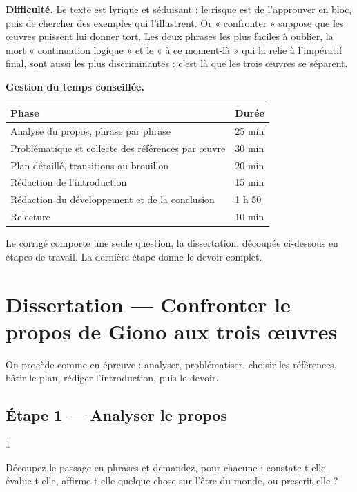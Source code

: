 \documentclass[11pt,a4paper]{article}
\begin{document}
\textbf{Difficulté.} Le texte est lyrique et séduisant : le risque est de l'approuver en bloc, puis de chercher des exemples qui l'illustrent. Or « confronter » suppose que les œuvres puissent lui donner tort. Les deux phrases les plus faciles à oublier, la mort « continuation logique » et le « à ce moment-là » qui la relie à l'impératif final, sont aussi les plus discriminantes : c'est là que les trois œuvres se séparent.

\textbf{Gestion du temps conseillée.}

\begin{longtable}[]{@{}ll@{}}
\toprule\noalign{}
Phase & Durée \\
\midrule\noalign{}
\endhead
\bottomrule\noalign{}
\endlastfoot
Analyse du propos, phrase par phrase & 25 min \\
Problématique et collecte des références par œuvre & 30 min \\
Plan détaillé, transitions au brouillon & 20 min \\
Rédaction de l'introduction & 15 min \\
Rédaction du développement et de la conclusion & 1 h 50 \\
Relecture & 10 min \\
\end{longtable}

Le corrigé comporte une seule question, la dissertation, découpée ci-dessous en étapes de travail. La dernière étape donne le devoir complet.

\hypertarget{dissertation-confronter-le-propos-de-giono-aux-trois-ux153uvres}{%
\section{Dissertation --- Confronter le propos de Giono aux trois œuvres}\label{dissertation-confronter-le-propos-de-giono-aux-trois-ux153uvres}}

On procède comme en épreuve : analyser, problématiser, choisir les références, bâtir le plan, rédiger l'introduction, puis le devoir.

\hypertarget{uxe9tape-1-analyser-le-propos}{%
\subsection{Étape 1 --- Analyser le propos}\label{uxe9tape-1-analyser-le-propos}}

\begin{indication}{1}

Découpez le passage en phrases et demandez, pour chacune : constate-t-elle, évalue-t-elle, affirme-t-elle quelque chose sur l'être du monde, ou prescrit-elle ?

\end{indication}
\end{document}
